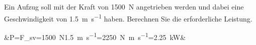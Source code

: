 \documentclass[a4paper]{scrartcl}
\begin{document}
\begin{aufgabe}[points={2}]
	Ein Aufzug soll mit der Kraft von \SI{1500}{\newton} angetrieben werden und dabei eine Geschwindigkeit von \SI{1,5}{\meter\per\second} haben. Berechnen Sie die erforderliche Leistung.\\
	
    \begin{loesung}
	\begin{flalign*}
	&P=F_s\cdot v=\SI{1500}{\newton}\cdot\SI{1,5}{\meter\per\second}=\SI{2250}{\newton\meter\per\second}=\SI{2,25}{\kilo\watt}&
	\end{flalign*}
    \end{loesung}
\end{aufgabe}
\vspace{0.3cm}
\newpage
\end{document}
